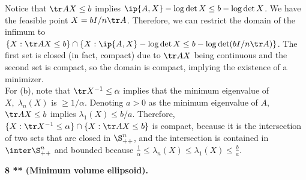 \documentclass[../borwein-lewis_notes.tex]{subfiles}
\begin{document}
\begin{enumerate}[(a)]
{Notice that $\tr AX \leq b$ implies $\ip{A,X} - \log\det X \leq 
b-\log\det X$. We have the feasible point $X = bI/n\tr A$. 
Therefore, we can restrict the domain of the infimum to 
$\{X:\tr AX \leq b\} \cap \{X: \ip{A,X}-\log\det X \leq b - 
\log\det (bI/n\tr A)\}$. The first set is closed (in fact, compact) 
due to $\tr AX$ being continuous and the second set 
is compact, so the domain is compact, implying the existence of a 
minimizer. \\
For (b), note that $\tr X^{-1}\leq \alpha$ implies that the minimum 
eigenvalue of $X,\; \lambda_n(X)$
 is $\geq 1/\alpha$. 
Denoting $a>0$ as the minimum eigenvalue of $A$, 
$\tr AX \leq b$ implies $\lambda_1(X)\leq b/a$. Therefore, 
$\{X : \tr X^{-1}\leq \alpha\} \cap \{X: \tr AX \leq b\}$
is compact, because it is the intersection of two sets that are closed 
in $\S_{++}^n$, and the intersection is contained in $\inter \S_{++}^n$
and bounded because $\frac{1}{\alpha}\leq \lambda_n(X) \leq \lambda_1(
X) \leq \frac{b}{a}$.
}
\end{enumerate}
\textbf{8 ** (Minimum volume ellipsoid).} 
\end{document}
